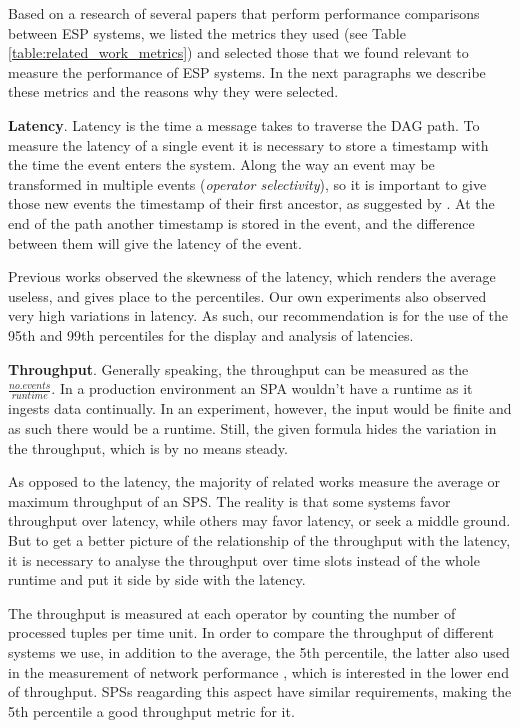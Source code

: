 \documentclass[ppgc,diss,english]{iiufrgs}
\begin{document}
Based on a research of several papers that perform performance comparisons between ESP systems, we listed the metrics they used (see Table \ref{table:related_work_metrics}) and selected those that we found relevant to measure the performance of ESP systems. In the next paragraphs we describe these metrics and the reasons why they were selected.

\textbf{Latency}. Latency is the time a message takes to traverse the DAG path. To measure the latency of a single event it is necessary to store a timestamp with the time the event enters the system. Along the way an event may be transformed in multiple events (\emph{operator selectivity}), so it is important to give those new events the timestamp of their first ancestor, as suggested by \cite{chandramouli2011accurate}. At the end of the path another timestamp is stored in the event, and the difference between them will give the latency of the event.

Previous works \cite{dayarathna2011performance, akidau2013millwheel, castro2013integrating} observed the skewness of the latency, which renders the average useless, and gives place to the percentiles. Our own experiments also observed very high variations in latency. As such, our recommendation is for the use of the 95th and 99th percentiles for the display and analysis of latencies.

\textbf{Throughput}. Generally speaking, the throughput can be measured as the $\frac{no. events}{runtime}$. In a production environment an SPA wouldn't have a runtime as it ingests data continually. In an experiment, however, the input would be finite and as such there would be a runtime. Still, the given formula hides the variation in the throughput, which is by no means steady.

As opposed to the latency, the majority of related works measure the average or maximum throughput of an SPS. The reality is that some systems favor throughput over latency, while others may favor latency, or seek a middle ground. But to get a better picture of the relationship of the throughput with the latency, it is necessary to analyse the throughput over time slots instead of the whole runtime and put it side by side with the latency.

The throughput is measured at each operator by counting the number of processed tuples per time unit. In order to compare the throughput of different systems we use, in addition to the average, the 5th percentile, the latter also used in the measurement of network performance \cite{litjens2010potential, landstrom2011deployment}, which is interested in the lower end of throughput. SPSs reagarding this aspect have similar requirements, making the 5th percentile a good throughput metric for it.
\end{document}
